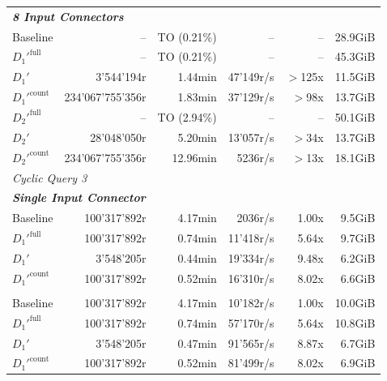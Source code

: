 \begin{longtable}{lrrrrr}
    \multicolumn{6}{l}{\textit{\textbf{8 Input Connectors}}} \\
    \nopagebreak
    Baseline              &  --                   &  TO (0.21\%)        &  --                  & --                & 28.9GiB   \\
    $D_1'^{\text{full}}$   &  --                   &  TO (0.21\%)        &  --                  & --                & 45.3GiB   \\
    \quad $D_1'$           &  3'544'194r           &  1.44min            &  47'149r/s           & $>$125x           & 11.5GiB   \\
    $D_1'^{\text{count}}$  &  234'067'755'356r     &  1.83min            &  37'129r/s           & $>$98x            & 13.7GiB   \\
    $D_2'^{\text{full}}$   &  --                   &  TO (2.94\%)        &  --                  & --                & 50.1GiB   \\
    \quad $D_2'$           &  28'048'050r          &  5.20min            &  13'057r/s           & $>$34x            & 13.7GiB   \\
    $D_2'^{\text{count}}$  &  234'067'755'356r     &  12.96min           &  5236r/s             & $>$13x            & 18.1GiB   \\
    \midrule
    
    \multicolumn{6}{l}{\textit{Cyclic Query 3}} \\
    \midrule
    \multicolumn{6}{l}{\textit{\textbf{Single Input Connector}}} \\
    \nopagebreak
    Baseline              &  100'317'892r         &  4.17min             &  2036r/s             & 1.00x             & 9.5GiB    \\
    $D_1'^{\text{full}}$   &  100'317'892r         &  0.74min             &  11'418r/s           & 5.64x             & 9.7GiB    \\
    \quad $D_1'$           &  3'548'205r           &  0.44min             &  19'334r/s           & 9.48x             & 6.2GiB    \\
    $D_1'^{\text{count}}$  &  100'317'892r         &  0.52min             &  16'310r/s           & 8.02x             & 6.6GiB    \\
    \addlinespace 
    
    \multicolumn{6}{l}{\textit{\textbf{5 Input Connectors}}} \\
    \nopagebreak
    Baseline              &  100'317'892r         &  4.17min             &  10'182r/s           & 1.00x             & 10.0GiB   \\
    $D_1'^{\text{full}}$   &  100'317'892r         &  0.74min             &  57'170r/s           & 5.64x             & 10.8GiB   \\
    \quad $D_1'$           &  3'548'205r           &  0.47min             &  91'565r/s           & 8.87x             & 6.7GiB    \\
    $D_1'^{\text{count}}$  &  100'317'892r         &  0.52min             &  81'499r/s           & 8.02x             & 6.9GiB    \\
    \midrule
    

\end{longtable}
